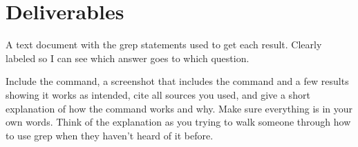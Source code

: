 \documentclass[12pt]{article}
\begin{document}
\section*{Deliverables}
A text document with the grep statements used to get each result.  Clearly labeled so I can see which answer goes to which question.


Include the command, a screenshot that includes the command and a few results showing it works as intended, cite all sources you used, and give a short explanation of how the command works and why. Make sure everything is in your own words.  Think of the explanation as you trying to walk someone through how to use grep when they haven't heard of it before.

\end{document}
